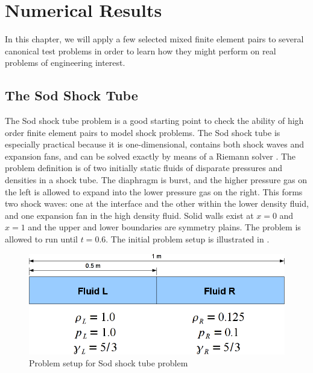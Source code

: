 
\chapter{Numerical Results} \label{chap:NumericalResults}

In this chapter, we will apply a few selected mixed finite element pairs to several canonical test problems in order to learn how they might perform on real problems of engineering interest. 

\section{The Sod Shock Tube}
The Sod shock tube problem \cite{Sod1978} is a good starting point to check the ability of high order finite element pairs to model shock problems. The Sod shock tube is especially practical because it is one-dimensional, contains both shock waves and expansion fans, and can be solved exactly by means of a Riemann solver \cite{Toro2006}. The problem definition is of two initially static fluids of disparate pressures and densities in a shock tube. The diaphragm is burst, and the higher pressure gas on the left is allowed to expand into the lower pressure gas on the right. This forms two shock waves: one at the interface and the other within the lower density fluid, and one expansion fan in the high density fluid. Solid walls exist at $x=0$ and $x=1$ and the upper and lower boundaries are symmetry plains. The problem is allowed to run until $t=0.6$. The initial problem setup is illustrated in .

\begin{figure}[h!]
 \centering
 \includegraphics[width=5in,keepaspectratio=true]{./Figures/SodShockTube.png}
 \caption{Problem setup for Sod shock tube problem}
 \label{fig:SodShockTube}
\end{figure}

